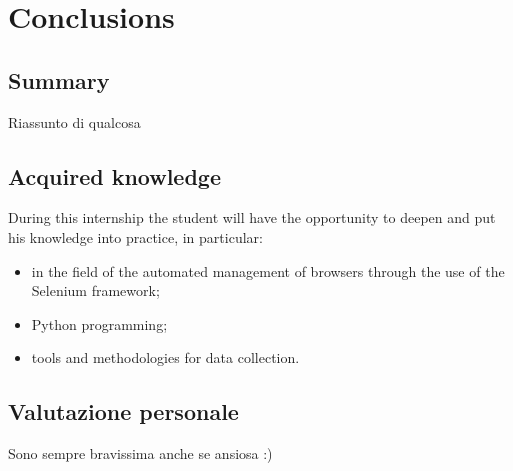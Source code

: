 
\chapter{Conclusions}
\label{cap:conclusions}
\section{Summary}
Riassunto di qualcosa
\section{Acquired knowledge}
During this internship the student will have the opportunity to deepen and put his knowledge into practice, in particular:
\begin{itemize}
	\item in the field of the automated management of browsers through the use of the Selenium framework;
	\item Python programming;
	\item tools and methodologies for data collection.
\end{itemize}
\section{Valutazione personale}
Sono sempre bravissima anche se ansiosa :)